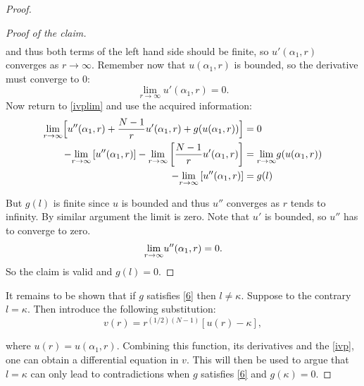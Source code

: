 \begin{proof}
\begin{proof}[Proof of the claim]
\begin{align*}
\end{align*} 
and thus both terms of the left hand side should be finite, so $u'(\alpha_1,r)$ converges as $r\to\infty.$ Remember now that $u(\alpha_1,r)$ is bounded, so the derivative must converge to 0: $$\underset{r\to\infty}{\lim}u'(\alpha_1,r)=0.$$ Now return to \eqref{ivplim} and use the acquired information: 
\begin{align*}
	\underset{r\to\infty}{\lim}\Big[u''(\alpha_1,r)+\frac{N-1}{r}u'(\alpha_1,r)+g(u(\alpha_1,r))\Big]&=0\\ 
	-\underset{r\to\infty}{\lim}\left[u''(\alpha_1,r)\right]
    -\underset{r\to\infty}{\lim}\left[\frac{N-1}{r}u'(\alpha_1,r)\right]&=\underset{r\to\infty}{\lim} g(u(\alpha_1,r))\\
	-\underset{r\to\infty}{\lim}\left[u''(\alpha_1,r)\right]&=g(l)
\end{align*}

But $g(l)$ is finite since $u$ is bounded and thus $u''$ converges as $r$ tends to infinity. By similar argument the limit is zero. Note that $u'$ is bounded, so $u''$ has to converge to zero. $$\underset{r\to\infty}{\lim} u''(\alpha_1,r)=0.$$ So the claim is valid and $g(l)=0$.\end{proof}  

It remains to be shown that if $g$ satisfies \eqref{6} then $l\neq\kappa.$ Suppose to the contrary $l=\kappa$. Then introduce the following substitution: 
$$v(r)=r^{(1/2)(N-1)}\left[u(r)-\kappa\right],$$ 

where $u(r)=u(\alpha_1,r)$. Combining this function, its derivatives and the \eqref{ivp}, one can obtain a differential equation in $v$. This will then be used to argue that $l=\kappa$ can only lead to contradictions when $g$ satisfies \eqref{6} and $g(\kappa)=0$. 


\end{proof}

